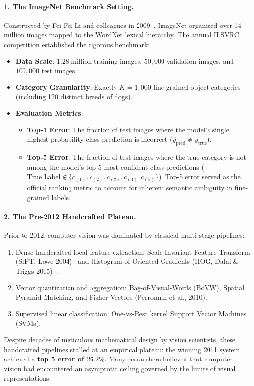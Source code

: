\paragraph{1. The ImageNet Benchmark Setting.}
Constructed by Fei-Fei Li and colleagues in 2009~\cite{deng2009imagenet}, ImageNet organized over 14 million images mapped to the WordNet lexical hierarchy. The annual ILSVRC competition established the rigorous benchmark:
\begin{itemize}[noitemsep]
  \item \textbf{Data Scale}: $1.28$ million training images, $50,000$ validation images, and $100,000$ test images.
  \item \textbf{Category Granularity}: Exactly $K = 1,000$ fine-grained object categories (including 120 distinct breeds of dogs).
  \item \textbf{Evaluation Metrics}:
    \begin{itemize}
      \item \textbf{Top-1 Error}: The fraction of test images where the model's single highest-probability class prediction is incorrect ($\hat{y}_{\text{pred}} \neq y_{\text{true}}$).
      \item \textbf{Top-5 Error}: The fraction of test images where the true category is not among the model's top 5 most confident class predictions ($\text{True Label} \notin \{c_{(1)}, c_{(2)}, c_{(3)}, c_{(4)}, c_{(5)}\}$). Top-5 error served as the official ranking metric to account for inherent semantic ambiguity in fine-grained labels.
    \end{itemize}
\end{itemize}

\paragraph{2. The Pre-2012 Handcrafted Plateau.}
Prior to 2012, computer vision was dominated by classical multi-stage pipelines:
\begin{enumerate}[leftmargin=*]
  \item Dense handcrafted local feature extraction: Scale-Invariant Feature Transform (SIFT, Lowe 2004)~\cite{lowe2004distinctive} and Histogram of Oriented Gradients (HOG, Dalal \& Triggs 2005)~\cite{dalal2005histograms}.
  \item Vector quantization and aggregation: Bag-of-Visual-Words (BoVW), Spatial Pyramid Matching, and Fisher Vectors (Perronnin et al., 2010).
  \item Supervised linear classification: One-vs-Rest kernel Support Vector Machines (SVMs).
\end{enumerate}
Despite decades of meticulous mathematical design by vision scientists, these handcrafted pipelines stalled at an empirical plateau: the winning 2011 system achieved a \textbf{top-5 error of $26.2\%$}. Many researchers believed that computer vision had encountered an asymptotic ceiling governed by the limits of visual representations.

